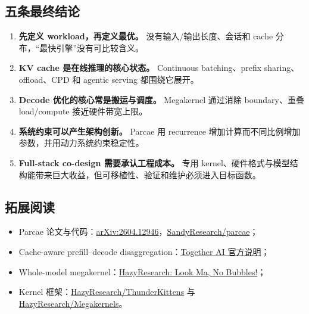\documentclass[a4paper]{article}
\begin{document}
\subsection{五条最终结论}

\begin{enumerate}
  \item \textbf{先定义 workload，再定义最优。} 没有输入/输出长度、会话和 cache 分布，“最快引擎”没有可比较含义。
  \item \textbf{KV cache 是在线推理的核心状态。} Continuous batching、prefix sharing、offload、CPD 和 agentic serving 都围绕它展开。
  \item \textbf{Decode 优化的核心常是搬运与调度。} Megakernel 通过消除 boundary、重叠 load/compute 接近硬件带宽上限。
  \item \textbf{系统约束可以产生架构创新。} Parcae 用 recurrence 增加计算而不同比例增加参数，并用动力系统约束稳定性。
  \item \textbf{Full-stack co-design 需要承认工程成本。} 专用 kernel、硬件格式与模型结构能带来巨大收益，但可移植性、验证和维护必须进入目标函数。
\end{enumerate}

\enlargethispage{2\baselineskip}
\subsection{拓展阅读}

\begin{itemize}
  \item Parcae 论文与代码：\href{https://arxiv.org/abs/2604.12946}{arXiv:2604.12946}，\href{https://github.com/sandyresearch/parcae}{SandyResearch/parcae}；
  \item Cache-aware prefill--decode disaggregation：\href{https://www.together.ai/blog/cache-aware-disaggregated-inference}{Together AI 官方说明}；
  \item Whole-model megakernel：\href{https://hazyresearch.stanford.edu/blog/2025-05-27-no-bubbles}{HazyResearch: Look Ma, No Bubbles!}；
  \item Kernel 框架：\href{https://github.com/HazyResearch/ThunderKittens}{HazyResearch/ThunderKittens} 与 \href{https://github.com/HazyResearch/Megakernels}{HazyResearch/Megakernels}。
\end{itemize}
\end{document}
